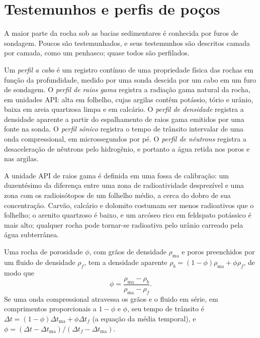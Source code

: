 \section{Testemunhos e perfis de poços}\label{sec:b3:facies-models:logs}

A maior parte da rocha sob as bacias sedimentares é conhecida por furos de sondagem. Poucos
são testemunhados, e seus testemunhos são descritos camada por camada, como um penhasco; quase todos
são perfilados.

\begin{definition}\label{def:b3:facies-models:wireline}
Um \emph{perfil a cabo} é um registro contínuo de uma
propriedade física das rochas em função da profundidade, medido por uma sonda descida por
um cabo em um furo de sondagem. O \emph{perfil de raios gama}
registra a radiação gama natural da rocha, em unidades API: alta em
folhelho, cujas argilas contêm potássio, tório e urânio, baixa em areia quartzosa limpa
e em calcário. O \emph{perfil de densidade}
registra a densidade aparente a partir do espalhamento de raios gama emitidos por uma
fonte na sonda. O \emph{perfil sônico} registra o
tempo de trânsito intervalar de uma onda compressional, em microssegundos por pé. O
\emph{perfil de nêutrons} registra a desaceleração de nêutrons pelo
hidrogênio, e portanto a água retida nos poros e nas argilas.
\end{definition}

A unidade API de raios gama é definida em uma fossa de calibração: um duzentésimo da
diferença entre uma zona de radioatividade desprezível e uma zona com
os radioisótopos de um folhelho médio, a cerca do dobro de sua concentração. Carvão,
calcário e dolomito costumam ser menos radioativos que o folhelho; o arenito quartzoso é baixo, e um
arcóseo rico em feldspato potássico é mais alto; qualquer rocha pode tornar-se radioativa pelo
urânio carreado pela água subterrânea.

\begin{proposition}\label{prop:b3:facies-models:porosity}
Uma rocha de porosidade $\phi$, com grãos de densidade $\rho_{\mathrm{ma}}$ e
poros preenchidos por um fluido de densidade $\rho_f$, tem a densidade aparente
$\rho_b = (1 - \phi)\rho_{\mathrm{ma}} + \phi\rho_f$, de modo que
\[
\phi = \frac{\rho_{\mathrm{ma}} - \rho_b}{\rho_{\mathrm{ma}} - \rho_f}.
\]
Se uma onda compressional atravessa os grãos e o fluido em série, em
comprimentos proporcionais a $1 - \phi$ e $\phi$, seu tempo de trânsito é
$\Delta t = (1 - \phi)\Delta t_{\mathrm{ma}} + \phi\Delta t_f$ (a
equação da média temporal), e $\phi = (\Delta t - \Delta
t_{\mathrm{ma}})/(\Delta t_f - \Delta t_{\mathrm{ma}})$.
\end{proposition}

